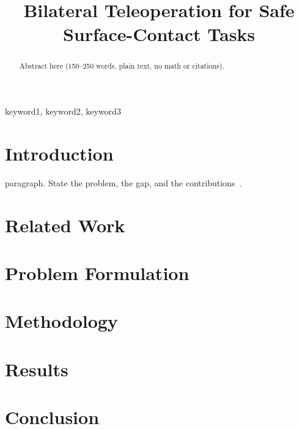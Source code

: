 \documentclass[conference]{IEEEtran} %
\begin{document}
\title{Bilateral Teleoperation for Safe Surface-Contact Tasks}

\author{
}

\maketitle

\begin{abstract}
Abstract here (150--250 words, plain text, no math or citations).
\end{abstract}

\begin{IEEEkeywords}
keyword1, keyword2, keyword3
\end{IEEEkeywords}

\section{Introduction}
 paragraph. State the problem, the gap, and the contributions~\cite{example2024key}.

\section{Related Work}

\section{Problem Formulation}

\section{Methodology}

\section{Results}

\section{Conclusion}



\end{document}
